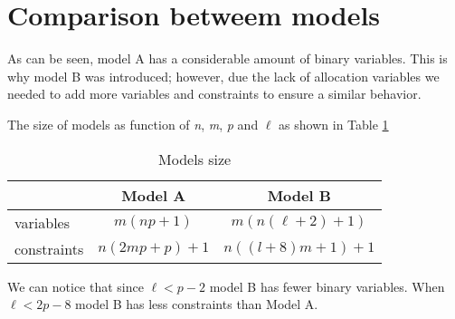 \section{Comparison betweem models}
As can be seen,
model A
has a considerable amount of binary variables.
This is why model B was introduced;
however, due the lack of allocation variables
we needed to add more variables and constraints
to ensure a similar behavior.

The size of models
as function of \textit{n}, \textit{m}, \textit{p} and $\ell$
as shown in Table \ref{tab:modsize}

\begin{table}[h]
  \label{tab:modsize}
  \centering
  \begin{tabular}{c|c|c|}
    \cline{2-3}
    & Model A & Model B \\ \hline
    \multicolumn{1}{|l|}{variables} &
    $m(np+1)$ &
    $m(n(\ell+2)+1)$ \\ \hline
    \multicolumn{1}{|l|}{constraints} &
    $n(2mp+p)+1$ &
    $n((l+8)m+1)+1$ \\ \hline
  \end{tabular}
  \caption{Models size}
\end{table}

We can notice that
since $\ell < p - 2$
model B has fewer binary variables.
When $\ell < 2p - 8$
model B has
less constraints than Model A.
